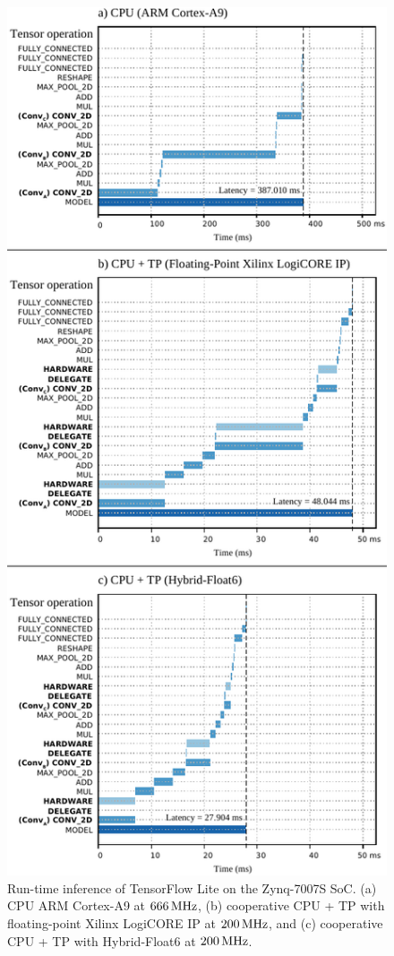 \begin{figure}[t!]
	\centering
	\includegraphics[width=1\columnwidth]{../figures/runtime/runtime.pdf}
	\caption{Run-time inference of TensorFlow Lite on the Zynq-7007S SoC. (a) CPU ARM Cortex-A9 at $\unit[666]{MHz}$, (b) cooperative CPU + TP with floating-point Xilinx LogiCORE IP at $\unit[200]{MHz}$, and (c) cooperative CPU + TP with Hybrid-Float6 at $\unit[200]{MHz}$.}
	\label{fig:runtime}
\end{figure}

